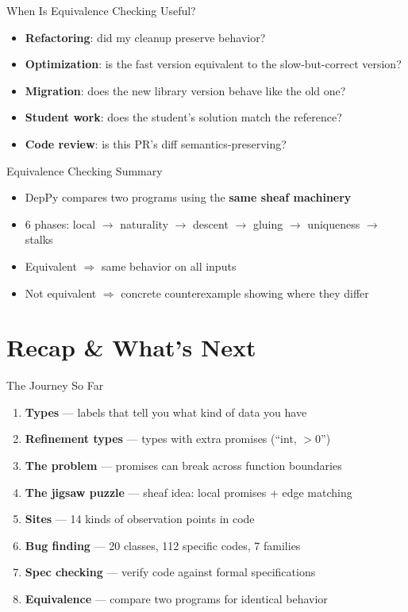 \documentclass[aspectratio=169,10pt]{beamer}
\begin{document}
\begin{frame}{When Is Equivalence Checking Useful?}
\begin{itemize}
  \item \textbf{Refactoring}: did my cleanup preserve behavior?
  \item \textbf{Optimization}: is the fast version equivalent to the slow-but-correct version?
  \item \textbf{Migration}: does the new library version behave like the old one?
  \item \textbf{Student work}: does the student's solution match the reference?
  \item \textbf{Code review}: is this PR's diff semantics-preserving?
\end{itemize}
\end{frame}

\begin{frame}{Equivalence Checking Summary}
\begin{itemize}
  \item DepPy compares two programs using the \textbf{same sheaf machinery}
  \item 6 phases: local $\to$ naturality $\to$ descent $\to$ gluing $\to$ uniqueness $\to$ stalks
  \item Equivalent $\Rightarrow$ same behavior on all inputs
  \item Not equivalent $\Rightarrow$ concrete counterexample showing where they differ
\end{itemize}
\end{frame}

\section{Recap \& What's Next}

\begin{frame}{The Journey So Far}
\begin{enumerate}
  \item \textbf{Types} --- labels that tell you what kind of data you have
  \item \textbf{Refinement types} --- types with extra promises (``int, $> 0$'')
  \item \textbf{The problem} --- promises can break across function boundaries
  \item \textbf{The jigsaw puzzle} --- sheaf idea: local promises + edge matching
  \item \textbf{Sites} --- 14 kinds of observation points in code
  \item \textbf{Bug finding} --- 20 classes, 112 specific codes, 7 families
  \item \textbf{Spec checking} --- verify code against formal specifications
  \item \textbf{Equivalence} --- compare two programs for identical behavior
\end{enumerate}
\end{frame}
\end{document}
